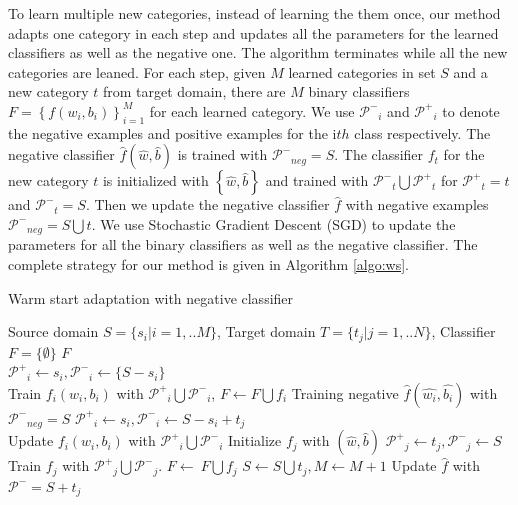 To learn multiple new categories, instead of learning the them once, our method adapts one category in each step and updates all the parameters for the learned classifiers as well as the negative one. The algorithm terminates while all the new categories are leaned.
For each step, given $M$ learned categories in set $S$ and a new category $t$ from target domain, there are $M$ binary classifiers $F=\left\{ {{f}\left( {{w_i},{b_i}} \right)} \right\}_{i = 1}^M$ for each learned category. We use $\mathcal{P^-}_i$ and $\mathcal{P^+}_i$ to denote the negative examples and positive examples for the i$th$ class respectively. The negative classifier $\hat{f}(\hat{w},\hat{b})$ is trained with $\mathcal{P^-}_{neg}=S$. The classifier $f_t$ for the new category $t$ is initialized with $\left\{\hat{w},\hat{b}\right\}$ and trained with $\mathcal{P^-}_t\bigcup\mathcal{P^+}_t$ for $\mathcal{P^+}_t=t$ and $\mathcal{P^-}_t=S$. Then we update the negative classifier $\hat{f}$ with negative examples $\mathcal{P^-}_{neg}=S\bigcup t$. We use Stochastic Gradient Descent (SGD) to update the parameters for all the binary classifiers as well as the negative classifier. The complete strategy for our method is given in Algorithm \ref{algo:ws}.
\begin{algorithm}
  \caption{Warm start adaptation with negative classifier}\label{algo:ws}
  \begin{algorithmic}[1]
    \REQUIRE Source domain $S = \{ {s_i}|i = 1,..M\} $, Target domain $T = \{ {t_j}|j = 1,..N\} $, Classifier $F = \{\emptyset\}$
    \ENSURE $F$\\
         \STATE $\mathcal{P^+}_i \leftarrow s_i, \mathcal{P^-}_i\leftarrow \{S-s_i\}$\\
          Train ${{f_i}\left( {{w_i},{b_i}} \right)}$ with $\mathcal{P^+}_i\bigcup\mathcal{P^-}_i$, $F\leftarrow F\bigcup f_i$
    \ENDFOR
    \STATE Training negative $\hat{f}\left( {\hat{w_i},\hat{b_i}} \right)$ with $\mathcal{P^-}_{neg}=S$
             \STATE $\mathcal{P^+}_i \leftarrow s_i, \mathcal{P^-}_i \leftarrow S-s_i+t_j$ \\
              Update ${{f_i}\left( {{w_i},{b_i}} \right)}$ with $\mathcal{P^+}_i\bigcup\mathcal{P^-}_i$
        \ENDFOR
        \STATE Initialize $f_j$ with $(\hat{w},\hat{b})$
        \STATE $\mathcal{P^+}_j \leftarrow t_j, \mathcal{P^-}_j\leftarrow S$
        \STATE Train $f_j$ with $\mathcal{P^+}_j\bigcup\mathcal{P^-}_j$.
        \STATE $F\leftarrow\ F\bigcup f_j$
        \STATE $S\leftarrow S\bigcup t_j, M\leftarrow M+1$
        \STATE Update $\hat{f}$ with $\mathcal{P^-}=S+t_j$
     \ENDWHILE
  \end{algorithmic}
\end{algorithm}
